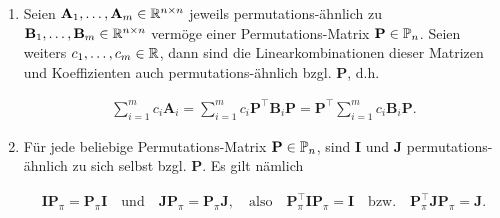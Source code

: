 \begin{remark}
\begin{enumerate}[
                        label = \arabic*.,
                        wide,
                        labelindent = 0pt
                    ]
                        Umgekehrt sind aber auch Matrizen, die sich bis auf \enquote{gleichzeitige} Zeilen- und Spalten-Vertauschungen (enkodiert in einer Permutation) unterscheiden, ähnlich bzgl. der entsprechenden Permutations-Matrix.

                        \item Seien $\mathbf A_1, \dots, \mathbf A_m \in \R^{n \times n}$ jeweils permutations-ähnlich zu $\mathbf B_1, \dots, \mathbf B_m \in \R^{n \times n}$ vermöge einer Permutations-Matrix $\mathbf P \in \P_n$.
                        Seien weiters $c_1, \dots, c_m \in \R$, dann sind die Linearkombinationen dieser Matrizen und Koeffizienten auch permutations-ähnlich bzgl. $\mathbf P$, d.h.

                        \begin{align*}
                            \sum_{i=1}^m c_i \mathbf A_i
                            =
                            \sum_{i=1}^m c_i \mathbf P^\top \mathbf B_i \mathbf P
                            =
                            \mathbf P^\top \sum_{i=1}^m c_i \mathbf B_i \mathbf P.
                        \end{align*}

                        \item Für jede beliebige Permutations-Matrix $\mathbf P \in \P_n$, sind $\mathbf I$ und $\mathbf J$ permutations-ähnlich zu sich selbst bzgl. $\mathbf P$.
                        Es gilt nämlich

                        \begin{align*}
                            \mathbf I \mathbf P_\pi = \mathbf P_\pi \mathbf I
                            \quad
                            \text{und}
                            \quad
                            \mathbf J \mathbf P_\pi = \mathbf P_\pi \mathbf J,
                            \quad
                            \text{also}
                            \quad
                            \mathbf P_\pi^\top \mathbf I \mathbf P_\pi = \mathbf I
                            \quad
                            \text{bzw.}
                            \quad
                            \mathbf P_\pi^\top \mathbf J \mathbf P_\pi = \mathbf J.
                        \end{align*}

                    \end{enumerate}

                \end{remark}

